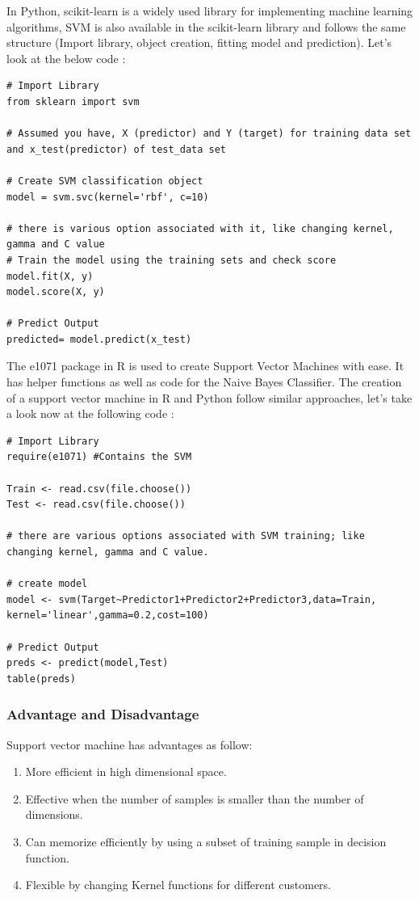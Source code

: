 \documentclass[sigconf]{acmart}
\begin{document}
In Python, scikit-learn is a widely used library for implementing machine learning algorithms, SVM is also available in the scikit-learn library and follows the same structure (Import library, object creation, fitting model and prediction). Let's look at the below code \cite{svm.code}:

\begin{lstlisting}
# Import Library
from sklearn import svm

# Assumed you have, X (predictor) and Y (target) for training data set and x_test(predictor) of test_data set

# Create SVM classification object
model = svm.svc(kernel='rbf', c=10) 

# there is various option associated with it, like changing kernel, gamma and C value
# Train the model using the training sets and check score
model.fit(X, y)
model.score(X, y)

# Predict Output
predicted= model.predict(x_test)
\end{lstlisting}

The e1071 package in R is used to create Support Vector Machines with ease. It has helper functions as well as code for the Naive Bayes Classifier. The creation of a support vector machine in R and Python follow similar approaches, let's take a look now at the following code \cite{svm.code}:
\begin{lstlisting}
# Import Library
require(e1071) #Contains the SVM

Train <- read.csv(file.choose())
Test <- read.csv(file.choose())

# there are various options associated with SVM training; like changing kernel, gamma and C value.

# create model
model <- svm(Target~Predictor1+Predictor2+Predictor3,data=Train,
kernel='linear',gamma=0.2,cost=100)

# Predict Output
preds <- predict(model,Test)
table(preds)
\end{lstlisting}

\subsubsection{Advantage and Disadvantage}

Support vector machine has advantages as follow:
\begin{enumerate}
    \item More efficient in high dimensional space.
    \item Effective when the number of samples is smaller than the number of dimensions.
    \item Can memorize efficiently by using a subset of training sample in decision function.
    \item Flexible by changing Kernel functions for different customers.
\end{enumerate}
\end{document}
